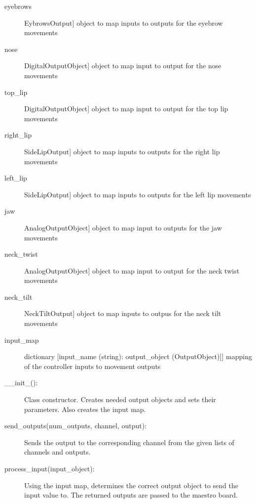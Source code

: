 \documentclass[letterpaper,10pt,english]{sphinxmanual}
\begin{document}
\begin{fulllineitems}
\begin{description}
\item[{eyebrows}] \leavevmode{[}EybrowsOutput{]}
\sphinxAtStartPar
object to map inputs to outputs for the eyebrow movements

\item[{nose}] \leavevmode{[}DigitalOutputObject{]}
\sphinxAtStartPar
object to map input to output for the nose movements

\item[{top\_lip}] \leavevmode{[}DigitalOutputObject{]}
\sphinxAtStartPar
object to map input to output for the top lip movements

\item[{right\_lip}] \leavevmode{[}SideLipOutput{]}
\sphinxAtStartPar
object to map inputs to outputs for the right lip movements

\item[{left\_lip}] \leavevmode{[}SideLipOutput{]}
\sphinxAtStartPar
object to map inputs to outputs for the left lip movements

\item[{jaw}] \leavevmode{[}AnalogOutputObject{]}
\sphinxAtStartPar
object to map input to outputs for the jaw movements

\item[{neck\_twist}] \leavevmode{[}AnalogOutputObject{]}
\sphinxAtStartPar
object to map input to output for the neck twist movements

\item[{neck\_tilt}] \leavevmode{[}NeckTiltOutput{]}
\sphinxAtStartPar
object to map inputs to outpus for the neck tilt movements

\item[{input\_map}] \leavevmode{[}dictionary {[}input\_name (string): output\_object (OutputObject){]}{]}
\sphinxAtStartPar
mapping of the controller inputs to movement outputs

\end{description}
\begin{description}
\item[{\_\_init\_():}] \leavevmode
\sphinxAtStartPar
Class constructor. Creates needed output objects and sets their parameters. Also creates the input map.

\item[{send\_outputs(num\_outputs, channel, output):}] \leavevmode
\sphinxAtStartPar
Sends the output to the corresponding channel from the given lists of channels and outputs.

\item[{process\_input(input\_object):}] \leavevmode
\sphinxAtStartPar
Using the input map, determines the correct output object to send the input value to. The returned outputs are passed to the maestro board.


\end{description}
\end{fulllineitems}
\end{document}
